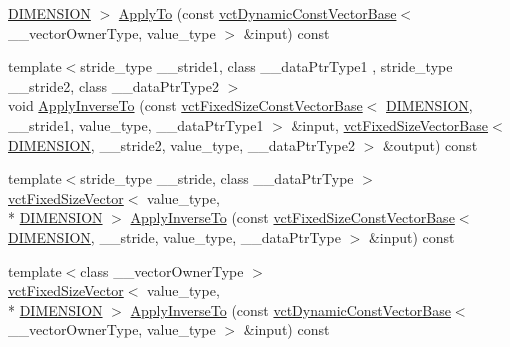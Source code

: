 \begin{DoxyCompactItemize}
\hyperlink{classvct_matrix_rotation3_const_base_a6bc9712dde55ee3fca0d7880feb6a903afdf02f4ad230d81f0ca2539c7feb61f3}{D\-I\-M\-E\-N\-S\-I\-O\-N} $>$ \hyperlink{classvct_matrix_rotation3_const_base_a97666c7b686e6a3c632aace4611a4e0e}{Apply\-To} (const \hyperlink{classvct_dynamic_const_vector_base}{vct\-Dynamic\-Const\-Vector\-Base}$<$ \-\_\-\-\_\-vector\-Owner\-Type, value\-\_\-type $>$ \&input) const 
\item 
{\footnotesize template$<$stride\-\_\-type \-\_\-\-\_\-stride1, class \-\_\-\-\_\-data\-Ptr\-Type1 , stride\-\_\-type \-\_\-\-\_\-stride2, class \-\_\-\-\_\-data\-Ptr\-Type2 $>$ }\\void \hyperlink{classvct_matrix_rotation3_const_base_ac93acb8c499f807f4983fd8f5a024329}{Apply\-Inverse\-To} (const \hyperlink{classvct_fixed_size_const_vector_base}{vct\-Fixed\-Size\-Const\-Vector\-Base}$<$ \hyperlink{classvct_matrix_rotation3_const_base_a6bc9712dde55ee3fca0d7880feb6a903afdf02f4ad230d81f0ca2539c7feb61f3}{D\-I\-M\-E\-N\-S\-I\-O\-N}, \-\_\-\-\_\-stride1, value\-\_\-type, \-\_\-\-\_\-data\-Ptr\-Type1 $>$ \&input, \hyperlink{classvct_fixed_size_vector_base}{vct\-Fixed\-Size\-Vector\-Base}$<$ \hyperlink{classvct_matrix_rotation3_const_base_a6bc9712dde55ee3fca0d7880feb6a903afdf02f4ad230d81f0ca2539c7feb61f3}{D\-I\-M\-E\-N\-S\-I\-O\-N}, \-\_\-\-\_\-stride2, value\-\_\-type, \-\_\-\-\_\-data\-Ptr\-Type2 $>$ \&output) const 
\item 
{\footnotesize template$<$stride\-\_\-type \-\_\-\-\_\-stride, class \-\_\-\-\_\-data\-Ptr\-Type $>$ }\\\hyperlink{classvct_fixed_size_vector}{vct\-Fixed\-Size\-Vector}$<$ value\-\_\-type, \\*
\hyperlink{classvct_matrix_rotation3_const_base_a6bc9712dde55ee3fca0d7880feb6a903afdf02f4ad230d81f0ca2539c7feb61f3}{D\-I\-M\-E\-N\-S\-I\-O\-N} $>$ \hyperlink{classvct_matrix_rotation3_const_base_a30a4e8383a9a979d80edf0d8765d3e86}{Apply\-Inverse\-To} (const \hyperlink{classvct_fixed_size_const_vector_base}{vct\-Fixed\-Size\-Const\-Vector\-Base}$<$ \hyperlink{classvct_matrix_rotation3_const_base_a6bc9712dde55ee3fca0d7880feb6a903afdf02f4ad230d81f0ca2539c7feb61f3}{D\-I\-M\-E\-N\-S\-I\-O\-N}, \-\_\-\-\_\-stride, value\-\_\-type, \-\_\-\-\_\-data\-Ptr\-Type $>$ \&input) const 
\item 
{\footnotesize template$<$class \-\_\-\-\_\-vector\-Owner\-Type $>$ }\\\hyperlink{classvct_fixed_size_vector}{vct\-Fixed\-Size\-Vector}$<$ value\-\_\-type, \\*
\hyperlink{classvct_matrix_rotation3_const_base_a6bc9712dde55ee3fca0d7880feb6a903afdf02f4ad230d81f0ca2539c7feb61f3}{D\-I\-M\-E\-N\-S\-I\-O\-N} $>$ \hyperlink{classvct_matrix_rotation3_const_base_a31ede991797a7d64c2e53e5580a50a58}{Apply\-Inverse\-To} (const \hyperlink{classvct_dynamic_const_vector_base}{vct\-Dynamic\-Const\-Vector\-Base}$<$ \-\_\-\-\_\-vector\-Owner\-Type, value\-\_\-type $>$ \&input) const 

\end{DoxyCompactItemize}
